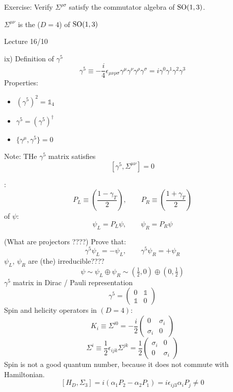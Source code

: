 \begin{example}
Exercise: Verify $\Sigma^{\rho\sigma}$ satisfy the commutator algebra of $\operatorname{SO}(1,3)$.
\end{example}

\begin{eigenschap}
$\Sigma^{\mu\nu}$ is the ($D=4$)  of $\operatorname{SO}(1,3)$
\end{eigenschap}

Lecture 16/10

ix) Definition of $\gamma^5$
\[ \gamma^5 \equiv - \frac{i}{4}\epsilon_{\mu\nu\rho\sigma}\gamma^\mu\gamma^\nu\gamma^\rho\gamma^\sigma = i\gamma^0\gamma^1\gamma^2\gamma^3 \]
Properties:
\begin{itemize}
\item $\left(\gamma^5\right)^2 = \mathbb{1}_4$
\item $\gamma^5 = \left(\gamma^5\right)^\dagger$
\item $\{\gamma^\mu,\gamma^5\} = 0$
\end{itemize}
Note: THe $\gamma^5$ matrix satisfies
\[ [\gamma^5, \Sigma^{\mu\nu}] = 0 \]

\begin{definition}
 :
\[ P_L \equiv \left(\frac{1-\gamma_T}{2}\right), \qquad P_R \equiv \left(\frac{1+\gamma_T}{2}\right)\]
 of $\psi$:
\[ \psi_L = P_L\psi, \qquad \psi_R = P_R \psi \]
\end{definition}
(What are projectors ????)
Prove that:
\[ \gamma^5\psi_L = -\psi_L, \qquad \gamma^5\psi_R = +\psi_R\]
$\psi_L$, $\psi_R$ are (the) irreducible????
\[ \psi \sim \psi_L\oplus\psi_R \sim (\tfrac{1}{2}, 0)\oplus(0, \tfrac{1}{2}) \]
$\gamma^5$ matrix in Dirac / Pauli representation
\[ \gamma^5 = \begin{pmatrix}
0 & \mathbb{1} \\ \mathbb{1} & 0
\end{pmatrix} \]
Spin and helicity operators in $(D = 4)$:
\[ K_i \equiv \Sigma^{i0} = - \frac{i}{2}\begin{pmatrix}
0 & \sigma_i \\ \sigma_i & 0
\end{pmatrix} \]
\[ \Sigma^{i} \equiv \frac{1}{2}\epsilon_{ijk}\Sigma^{jk} = \frac{1}{2}\begin{pmatrix}
\sigma_i & 0 \\ 0 & \sigma_i
\end{pmatrix} \]
Spin is not a good quantum number, because it does not commute with Hamiltonian.
\[ [H_D, \Sigma_3] = i(\alpha_1 P_2 - \alpha_2 P_1) = i\epsilon_{ij3}\alpha_iP_j \neq 0 \]


